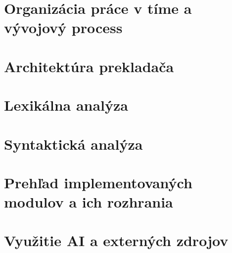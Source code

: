 \documentclass[11pt, a4paper]{article}
\begin{document}
\tableofcontents
\newpage

\section{Organizácia práce v tíme a vývojový process}


\section{Architektúra prekladača}


\section{Lexikálna analýza}


\section{Syntaktická analýza}


\section{Prehľad implementovaných modulov a ich rozhrania}


\section{Využitie AI a externých zdrojov}

\end{document}
